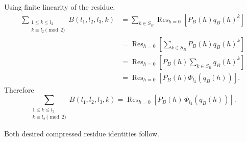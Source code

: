 Using finite linearity of the residue,
\begin{align*}
\sum_{\substack{1\le k\le l_2\\ k\equiv l_2\pmod 2}}
B(l_1,l_2,l_3,k)
&=
\sum_{k\in S_B}
\operatorname{Res}_{h=0}\!\left[P_B(h)q_B(h)^k\right] \\
&=
\operatorname{Res}_{h=0}\!\left[
\sum_{k\in S_B}P_B(h)q_B(h)^k
\right] \\
&=
\operatorname{Res}_{h=0}\!\left[
P_B(h)\sum_{k\in S_B}q_B(h)^k
\right] \\
&=
\operatorname{Res}_{h=0}\!\left[
P_B(h)\Phi_{l_2}(q_B(h))
\right].
\end{align*}
Therefore
\[
\boxed{
\sum_{\substack{1\le k\le l_2\\ k\equiv l_2\pmod2}} B(l_1,l_2,l_3,k)
=
\operatorname{Res}_{h=0}\!\left[P_B(h)\,\Phi_{l_2}(q_B(h))\right].
}
\]

Both desired compressed residue identities follow.